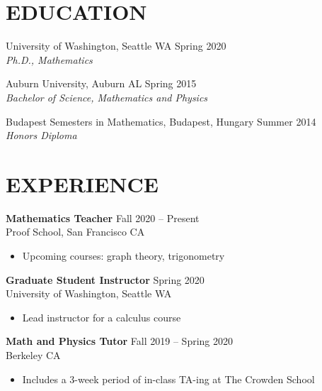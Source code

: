 \documentclass{res}
\begin{document}



\address{\bf
CONTACT \\
grahamwalkergordon@gmail.com \(\mid\)
\url{https://grahamwgordon.github.io/}
}
\begin{resume}


\section{EDUCATION}
  \vspace{2mm}
  University of Washington, Seattle WA \hfill Spring 2020\\
  \textit{Ph.D., Mathematics}
  
  Auburn University, Auburn AL \hfill Spring 2015 \\
  \textit{Bachelor of Science, Mathematics and Physics}

  Budapest Semesters in Mathematics, Budapest, Hungary \hfill Summer 2014 \\
  \textit{Honors Diploma}

\section{EXPERIENCE}
  \vspace{2mm}

{\bf Mathematics Teacher} \hfill Fall 2020 -- Present \\ Proof School, San Francisco CA

\begin{itemize}
	\item Upcoming courses: graph theory, trigonometry
\end{itemize}

{\bf Graduate Student Instructor} \hfill Spring 2020 \\ University of Washington, Seattle WA

\begin{itemize}
\item Lead instructor for a calculus course
\end{itemize}


{\bf Math and Physics Tutor} \hfill Fall 2019 -- Spring 2020 \\ Berkeley CA
\begin{itemize}
\item Includes a 3-week period of in-class TA-ing at The Crowden School
\end{itemize}



\end{resume}
\end{document}
